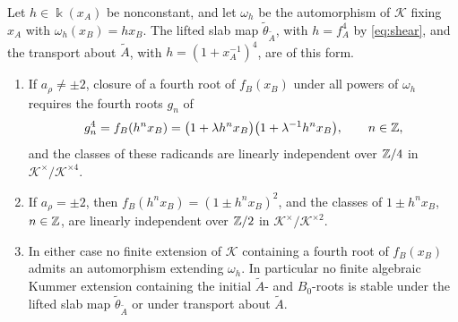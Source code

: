 \begin{theorem}\label{thm:infinite-root-orbit}
Let $h\in\Bbbk(x_A)$ be nonconstant, and let $\omega_h$ be the automorphism
of $\mathcal K$ fixing $x_A$ with $\omega_h(x_B)=hx_B$.  The lifted slab
map $\widetilde\theta_{\widetilde A}$, with $h=f_A^4$ by \eqref{eq:shear},
and the transport about $\widetilde A$,
with $h=(1+x_A^{-1})^4$, are of this form.
\begin{enumerate}
\item If $a_\rho\neq\pm2$, closure of a fourth root of $f_B(x_B)$ under all
powers of $\omega_h$ requires the fourth roots $g_n$ of
\begin{equation}\label{eq:root-tower}
 g_n^4=f_B(h^nx_B)
 =\bigl(1+\lambda h^nx_B\bigr)\bigl(1+\lambda^{-1}h^nx_B\bigr),
 \qquad n\in\mathbb Z,
\end{equation}
and the classes of these radicands are linearly independent over $\mathbb Z/4$ in
$\mathcal K^\times/\mathcal K^{\times4}$.
\item If $a_\rho=\pm2$, then $f_B(h^nx_B)=(1\pm h^nx_B)^2$, and the classes of
$1\pm h^nx_B$, $n\in\mathbb Z$, are linearly independent over $\mathbb Z/2$ in
$\mathcal K^\times/\mathcal K^{\times2}$.
\item In either case no finite extension of $\mathcal K$ containing a fourth root
of $f_B(x_B)$ admits an automorphism extending $\omega_h$.  In particular no
finite algebraic Kummer extension containing the initial $\widetilde A$- and
$B_0$-roots is stable under the lifted slab map
$\widetilde\theta_{\widetilde A}$ or under transport about $\widetilde A$.
\end{enumerate}
\end{theorem}

